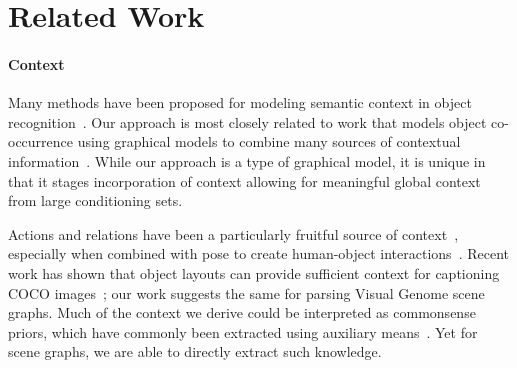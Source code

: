 \documentclass[10pt,twocolumn,letterpaper]{article}
\begin{document}
\section{Related Work}
\label{sec:relation_work}
\paragraph{Context}%
Many methods have been proposed for modeling semantic context in object recognition~\cite{divvala2009empirical}. 
Our approach is most closely related to work that models object co-occurrence using graphical models to combine many sources of contextual information~\cite{rabinovich2007objects,galleguillos2010context,li2007,farhadi2010every}.
While our approach is a type of graphical model, it is unique in that it stages incorporation of context allowing for meaningful global context from large conditioning sets.

Actions and relations have been a particularly fruitful source of context~\cite{marszalek2009actions, yatskar_situation_2016}, especially when combined with pose to create human-object interactions~\cite{yao2010modeling,chao:iccv2015}. Recent work has shown that object layouts can provide sufficient context for captioning COCO images~\cite{obj2textEMNLP2017,mscoco}; our work suggests the same for parsing Visual Genome scene graphs.
Much of the context we derive could be interpreted as commonsense priors, which have commonly been extracted using auxiliary means~\cite{zhu2014reasoning, viske, neil, Yatskar_VCommonSense_16, emnlp17_zellers}. 
Yet for scene graphs, we are able to directly extract such knowledge.
\end{document}
